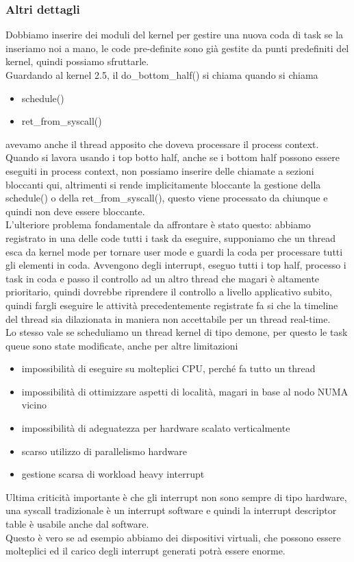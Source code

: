 \documentclass[12pt, oneside]{extbook}
\begin{document}
\subsubsection{Altri dettagli}
Dobbiamo inserire dei moduli del kernel per gestire una nuova coda di task se la inseriamo noi a mano, le code pre-definite sono già gestite da punti predefiniti del kernel, quindi possiamo sfruttarle.\\Guardando al kernel 2.5, il do\_bottom\_half() si chiama quando si chiama
\begin{itemize}
\item \textsf{schedule()}
\item \textsf{ret\_from\_syscall()}
\end{itemize}
avevamo anche il thread apposito che doveva processare il process context.\\Quando si lavora usando i top botto half, anche se i bottom half possono essere eseguiti in process context, non possiamo inserire delle chiamate a sezioni bloccanti qui, altrimenti si rende implicitamente bloccante la gestione della \textsf{schedule()} o della \textsf{ret\_from\_syscall()}, questo viene processato da chiunque e quindi non deve essere bloccante.\\L'ulteriore problema fondamentale da affrontare è stato questo: abbiamo registrato in una delle code tutti i task da eseguire, supponiamo che un thread esca da kernel mode per tornare user mode e guardi la coda per processare tutti gli elementi in coda. Avvengono degli interrupt, eseguo tutti i top half, processo i task in coda e passo il controllo ad un altro thread che magari è altamente prioritario, quindi dovrebbe riprendere il controllo a livello applicativo subito, quindi fargli eseguire le attività precedentemente registrate fa si che la timeline del thread sia dilazionata in maniera non accettabile per un thread real-time.\\Lo stesso vale se scheduliamo un thread kernel di tipo demone, per questo le task queue sono state modificate, anche per altre limitazioni
\begin{itemize}
\item impossibilità di eseguire su molteplici CPU, perché fa tutto un thread
\item impossibilità di ottimizzare aspetti di località, magari in base al nodo NUMA vicino
\item impossibilità di adeguatezza per hardware scalato verticalmente
\item scarso utilizzo di parallelismo hardware
\item gestione scarsa di workload heavy interrupt
\end{itemize}
Ultima criticità importante è che gli interrupt non sono sempre di tipo hardware, una syscall tradizionale è un interrupt software e quindi la interrupt descriptor table è usabile anche dal software.\\Questo è vero se ad esempio abbiamo dei dispositivi virtuali, che possono essere molteplici ed il carico degli interrupt generati potrà essere enorme.
\end{document}
